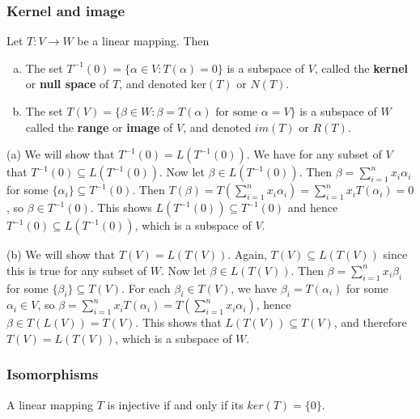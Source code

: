 \documentclass[12pt,letterpaper,reqno]{article}
\numberwithin{equation}{section}
\newcommand{\fixme}[1]{{\color{orange}{[#1]}}}
\begin{document}
\subsubsection{Kernel and image}
\fixme{Need to use isomorphism between linear transformations and matrices to recast kernel and image (use range) with Null space and column space here. Switch this section with the next one?}
\begin{thm}
Let $T:V \to W$ be a linear mapping. Then
	\begin{enumerate}[(a)]
		\item The set $T^{-1}(0)=\{\alpha \in V:T(\alpha)=0\}$ is a subspace of $V$, called the {\bf kernel} or {\bf null space} of $T$, and denoted $\text{ker}(T)$ or $N(T)$.
		\item The set $T(V)=\{\beta \in W:\beta=T(\alpha) \text{ for some } \alpha=V\}$ is a subspace of $W$ called the {\bf range} or {\bf image} of $V$, and denoted $im(T)$ or $R(T)$.
	\end{enumerate}	
\end{thm}

\begin{pf}
(a) We will show that $T^{-1}(0)=L(T^{-1}(0))$. We have for any subset of $V$ that $T^{-1}(0)\subseteq L(T^{-1}(0))$. Now let $\beta \in L(T^{-1}(0))$. Then $\beta=\sum_{i=1}^nx_i\alpha_i$ for some $\{\alpha_i\} \subseteq T^{-1}(0)$. Then $T(\beta)=T(\sum_{i=1}^nx_i\alpha_i)=\sum_{i=1}^nx_iT(\alpha_i)=0$, so $\beta \in T^{-1}(0)$. This shows $L(T^{-1}(0)) \subseteq T^{-1}(0) $ and hence $T^{-1}(0)\subseteq L(T^{-1}(0))$, which is a subspace of $V$. 

(b) We will show that $T(V)=L(T(V))$. Again, $T(V) \subseteq L(T(V))$ since this is true for any subset of $W$. Now let $\beta \in L(T(V))$. Then $\beta=\sum_{i=1}^nx_i\beta_i$ for some $\{\beta_i\} \subseteq T(V)$. For each $\beta_i \in T(V)$, we have $\beta_i=T(\alpha_i)$ for some $\alpha_i \in V$, so $\beta=\sum_{i=1}^nx_iT(\alpha_i)=T(\sum_{i=1}^nx_i\alpha_i)$, hence $\beta \in T(L(V))=T(V)$. This shows that $L(T(V)) \subseteq T(V)$, and therefore $T(V)=L(T(V))$, which is a subspace of $W$.	
\end{pf}

\subsubsection{Isomorphisms}

\begin{lem}
	A linear mapping $T$ is injective if and only if its $ker(T)=\{0\}$.
\end{lem}
\end{document}
